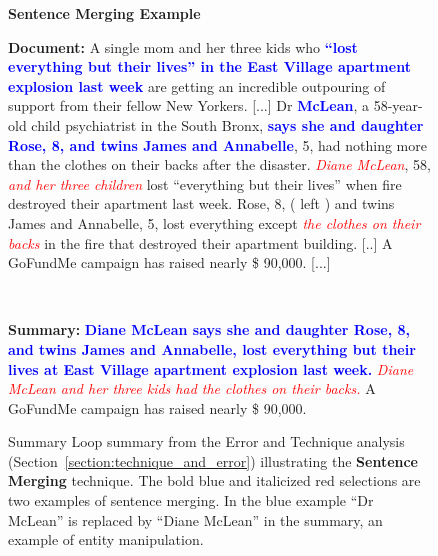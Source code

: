 \documentclass[11pt,a4paper]{article}
\begin{document}
\begin{figure*}[!htbp]
    \begin{framed}
        \begin{center}
            \large
            \textbf{Sentence Merging Example}
        \end{center}
        
        \textbf{Document:} 
        A single mom and her three kids who \textbf{\textcolor{blue}{``lost everything but their lives'' in the East Village apartment explosion last week}} are getting an incredible outpouring of support from their fellow New Yorkers. [...] Dr \textbf{\textcolor{blue}{McLean}}, a 58-year-old child psychiatrist in the South Bronx, \textbf{\textcolor{blue}{says she and daughter Rose, 8, and twins James and Annabelle}}, 5, had nothing more than the clothes on their backs after the disaster. \textit{\textcolor{red}{Diane McLean}}, 58, \textit{\textcolor{red}{and her three children}} lost ``everything but their lives'' when fire destroyed their apartment last week. Rose, 8, ( left ) and twins James and Annabelle, 5, lost everything except \textit{\textcolor{red}{the clothes on their backs}} in the fire that destroyed their apartment building. [..] A GoFundMe campaign has raised nearly \$ 90,000. [...]
         \begin{center}
            ~
        \end{center}
        \textbf{Summary:} \textbf{\textcolor{blue}{Diane McLean says she and daughter Rose, 8, and twins James and Annabelle, lost everything but their lives at East Village apartment explosion last week.}} \textit{\textcolor{red}{Diane McLean and her three kids had the clothes on their backs.}} A GoFundMe campaign has raised nearly \$ 90,000. 
    \end{framed}

    \caption{Summary Loop summary from the Error and Technique analysis (Section~\ref{section:technique_and_error}) illustrating the \textbf{Sentence Merging} technique. The bold blue and italicized red selections are two examples of sentence merging. In the blue example ``Dr McLean'' is replaced by ``Diane McLean'' in the summary, an example of entity manipulation.}    \label{fig:extra_examples2}
\end{figure*}
\end{document}
